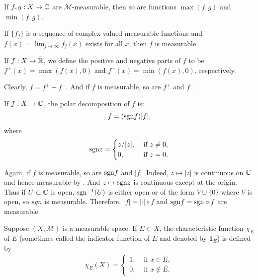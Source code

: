 \begin{corollary}
    If $f, g: X \to \mathbb{C}$ are $\mathcal{M}$-measurable, then so are functions $\max(f, g)$ and $\min(f, g)$.
\end{corollary}

\begin{corollary}
    If $\{ f_j \}$ is a sequence of complex-valued measurable functions and $f(x) = \lim_{j \to \infty} f_j(x)$ exists for all $x$, then $f$ is measurable.
\end{corollary}

\begin{definition}
    If $f: X \to \bar{\mathbb{R}}$, we define the positive and negative parts of $f$ to be $f^{+}(x) = \max(f(x), 0)$ and $f^{-}(x) = \min(f(x), 0)$, respectively. 
\end{definition}

Clearly, $f = f^{+} - f^{-}$.
And if $f$ is measurable, so are $f^{+}$ and $f^{-}$.

\begin{definition}
    If $f: X \to \mathbb{C}$, the polar decomposition of $f$ is:
    \begin{align}
        f = (\mathrm{sgn} f) |f|,
    \end{align}
    where 
    \begin{align}
        \mathrm{sgn} z = \begin{cases}
            z / |z|, & \text{ if } z \ne 0, \\
            0, & \text{ if } z = 0.
        \end{cases}
    \end{align}
\end{definition}

Again, if $f$ is measurable, so are $\mathrm{sgn} f$ and $|f|$.
Indeed, $z \mapsto |z|$ is continuous on $\mathbb{C}$ and hence measurable by .
And $z \mapsto \mathrm{sgn} z$ is continuous except at the origin.
Thus if $U \subset \mathbb{C}$ is open, $\mathrm{sgn}^{-1}(U)$ is either open or of the form $V\cup\{0\}$ where $V$ is open, so $sgn$ is measurable.
Therefore, $|f| = |\cdot| \circ f$ and $\mathrm{sgn} f = \mathrm{sgn} \circ f$ are measurable.

\begin{definition}
    Suppose $(X, \mathcal{M})$ is a measurable space.
    If $E \subset X$, the characteristic function $\chi_E$ of $E$ (sometimes called the indicator function of $E$ and denoted by $\mathbf{1}_E$) is defined by
    \begin{align}
        \chi_E(X) = \begin{cases}
            1, & \text{ if } x \in E, \\
            0, & \text{ if } x \notin E.
        \end{cases}
    \end{align}
\end{definition}

